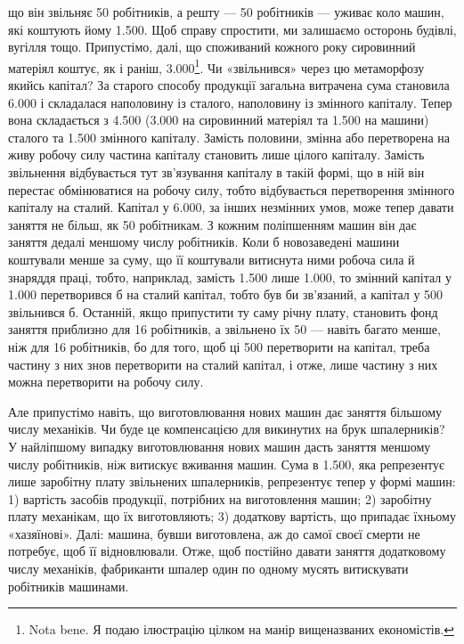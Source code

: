 \parcont{}  %
що він звільняє 50 робітників, а решту — 50 робітників — уживає
коло машин, які коштують йому \num{1.500}. Щоб
справу спростити, ми залишаємо осторонь будівлі, вугілля тощо.
Припустімо, далі, що споживаний кожного року сировинний
матеріял коштує, як і раніш, \num{3.000}\footnote{
Nota bene. Я подаю ілюстрацію цілком на манір вищеназваних
економістів.
}. Чи «звільнився» через цю метаморфозу якийсь капітал? За старого
способу продукції загальна витрачена сума становила \num{6.000} і складалася наполовину із сталого, наполовину із
змінного капіталу. Тепер вона складається з \num{4.500}
(\num{3.000} на сировинний матеріял та \num{1.500} на машини) сталого та \num{1.500} змінного
капіталу. Замість половини, змінна або перетворена на живу робочу
силу частина капіталу становить лише цілого капіталу. Замість
звільнення відбувається тут зв’язування капіталу в такій формі,
що в ній він перестає обмінюватися на робочу силу, тобто відбувається
перетворення змінного капіталу на сталий. Капітал у \num{6.000}, за інших незмінних умов, може тепер давати заняття
не більш, як 50 робітникам. З кожним поліпшенням машин він
дає заняття дедалі меншому числу робітників. Коли б новозаведені
машини коштували менше за суму, що її коштували витиснута
ними робоча сила й знаряддя праці, тобто, наприклад, замість
\num{1.500} лише \num{1.000}, то змінний
капітал у \num{1.000} перетворився б на сталий капітал,
тобто був би зв’язаний, а капітал у 500
звільнився б. Останній, якщо припустити ту саму річну плату,
становить фонд заняття приблизно для 16 робітників, а звільнено
їх 50 — навіть багато менше, ніж для 16 робітників, бо для того,
щоб ці 500 перетворити на капітал, треба частину
з них знов перетворити на сталий капітал, і отже, лише частину
з них можна перетворити на робочу силу.

Але припустімо навіть, що виготовлювання нових машин дає
заняття більшому числу механіків. Чи буде це компенсацією
для викинутих на брук шпалерників? У найліпшому випадку
виготовлювання нових машин дасть заняття меншому числу
робітників, ніж витискує вживання машин. Сума в \num{1.500}, яка репрезентує лише заробітну плату звільнених
шпалерників, репрезентує тепер у формі машин: 1) вартість засобів
продукції, потрібних на виготовлення машин; 2) заробітну
плату механікам, що їх виготовляють; 3) додаткову вартість, що
припадає їхньому «хазяїнові». Далі: машина, бувши виготовлена,
аж до самої своєї смерти не потребує, щоб її відновлювали. Отже,
щоб постійно давати заняття додатковому числу механіків, фабриканти
шпалер один по одному мусять витискувати робітників
машинами.

